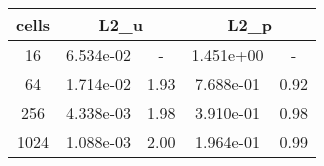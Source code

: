 \documentclass[10pt]{report}
\begin{document}
\begin{table}[H]
\begin{center}
\begin{tabular}{|c|c|c|c|c|} \hline
cells & 
\multicolumn{2}{|c|}{L2_u} & 
\multicolumn{2}{|c|}{L2_p}\\ \hline
16 & 6.534e-02 & - & 1.451e+00 & -\\ \hline
64 & 1.714e-02 & 1.93 & 7.688e-01 & 0.92\\ \hline
256 & 4.338e-03 & 1.98 & 3.910e-01 & 0.98\\ \hline
1024 & 1.088e-03 & 2.00 & 1.964e-01 & 0.99\\ \hline
\end{tabular}
\end{center}
\end{table}
\end{document}
